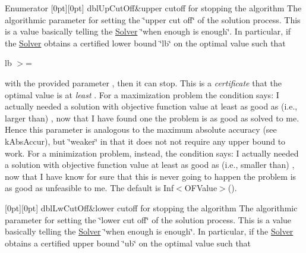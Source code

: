 \begin{DoxyEnumFields}{Enumerator}
[0pt][0pt]{}\mbox{\label{class_s_m_spp__di__unipi__it_1_1_solver_ace6215148d1e3c41a8844f6d692ee132a22be127e17b811416b84944432a35ca5}} 
dbl\+Up\+Cut\+Off&upper cutoff for stopping the algorithm The algorithmic parameter for setting the \char`\"{}upper cut 
        off\char`\"{} of the solution process. This is a value basically telling the \mbox{\hyperlink{class_s_m_spp__di__unipi__it_1_1_solver}{Solver}} \char`\"{}when enough is enough\char`\"{}. In particular, if the \mbox{\hyperlink{class_s_m_spp__di__unipi__it_1_1_solver}{Solver}} obtains a certified lower bound \char`\"{}lb\char`\"{} on the optimal value such that

lb $>$= 

with the provided parameter , then it can stop. This is a {\itshape certificate} that the optimal value is at {\itshape least} . For a maximization problem the condition says\+: I actually needed a solution with objective function value at least as good as (i.\+e., larger than) , now that I have found one the problem is as good as solved to me. Hence this parameter is analogous to the maximum absolute accuracy (see k\+Abs\+Accur), but \char`\"{}weaker\char`\"{} in that it does not not require any upper bound to work. For a minimization problem, instead, the condition says\+: I actually needed a solution with objective function value at least as good as (i.\+e., smaller than) , now that I have know for sure that this is never going to happen the problem is as good as unfeasible to me. The default is Inf$<$\+O\+F\+Value$>$(). \\
\hline

[0pt][0pt]{}\mbox{\label{class_s_m_spp__di__unipi__it_1_1_solver_ace6215148d1e3c41a8844f6d692ee132adaf90064ffac03f204c43a0adf226f58}} 
dbl\+Lw\+Cut\+Off&lower cutoff for stopping the algorithm The algorithmic parameter for setting the \char`\"{}lower cut 
        off\char`\"{} of the solution process. This is a value basically telling the \mbox{\hyperlink{class_s_m_spp__di__unipi__it_1_1_solver}{Solver}} \char`\"{}when enough is enough\char`\"{}. In particular, if the \mbox{\hyperlink{class_s_m_spp__di__unipi__it_1_1_solver}{Solver}} obtains a certified upper bound \char`\"{}ub\char`\"{} on the optimal value such that


\end{DoxyEnumFields}
